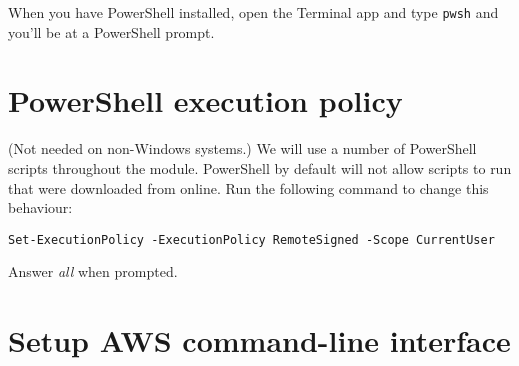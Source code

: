 When you have PowerShell installed, open the Terminal app and type
\texttt{pwsh} and you'll be at a PowerShell prompt.

\section{PowerShell execution policy}
\label{sec:powershell-execution-policy}

(Not needed on non-Windows systems.)
We will use a number of PowerShell scripts throughout the module. 
PowerShell by default will not allow scripts to run that were downloaded from online.
Run the following command to change this behaviour:

\begin{verbatim}
Set-ExecutionPolicy -ExecutionPolicy RemoteSigned -Scope CurrentUser
\end{verbatim}

Answer \textit{all} when prompted.


\section{Setup AWS command-line interface}
\label{sec:setup-aws-command-line-interface}

